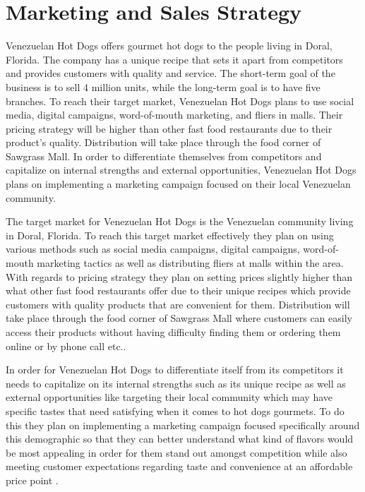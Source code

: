 

\section{Marketing and Sales Strategy}\label{sec:marketing-sales-strategy} 
 Venezuelan Hot Dogs offers gourmet hot dogs to the people living in Doral, Florida. The company has a unique recipe that sets it apart from competitors and provides customers with quality and service. The short-term goal of the business is to sell 4 million units, while the long-term goal is to have five branches. To reach their target market, Venezuelan Hot Dogs plans to use social media, digital campaigns, word-of-mouth marketing, and fliers in malls. Their pricing strategy will be higher than other fast food restaurants due to their product's quality. Distribution will take place through the food corner of Sawgrass Mall. In order to differentiate themselves from competitors and capitalize on internal strengths and external opportunities, Venezuelan Hot Dogs plans on implementing a marketing campaign focused on their local Venezuelan community. 

The target market for Venezuelan Hot Dogs is the Venezuelan community living in Doral, Florida. To reach this target market effectively they plan on using various methods such as social media campaigns, digital campaigns, word-of-mouth marketing tactics as well as distributing fliers at malls within the area. With regards to pricing strategy they plan on setting prices slightly higher than what other fast food restaurants offer due to their unique recipes which provide customers with quality products that are convenient for them. Distribution will take place through the food corner of Sawgrass Mall where customers can easily access their products without having difficulty finding them or ordering them online or by phone call etc.. 

In order for Venezuelan Hot Dogs to differentiate itself from its competitors it needs to capitalize on its internal strengths such as its unique recipe as well as external opportunities like targeting their local community which may have specific tastes that need satisfying when it comes to hot dogs gourmets. To do this they plan on implementing a marketing campaign focused specifically around this demographic so that they can better understand what kind of flavors would be most appealing in order for them stand out amongst competition while also meeting customer expectations regarding taste and convenience at an affordable price point .  

